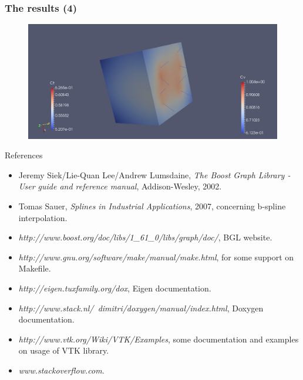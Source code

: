 \documentclass[11pt]{beamer}
\begin{document}
	\begin{frame}
		\frametitle{The results (4)}	
		\begin{figure}[!h]
			\centering
			\includegraphics[width=0.9\linewidth]{ct3}
			\label{fig:ct3}
		\end{figure}
	\end{frame}

	\begin{frame}{References}
		\begin{itemize}
			\item Jeremy Siek/Lie-Quan Lee/Andrew Lumsdaine, \textit{The Boost Graph Library - User guide and reference manual}, Addison-Wesley, 2002.
			\item Tomas Sauer, \textit{Splines in Industrial Applications}, 2007, concerning b-spline interpolation.
			\item \textit{http://www.boost.org/doc/libs/1\_61\_0/libs/graph/doc/}, BGL website.
			\item \textit{http://www.gnu.org/software/make/manual/make.html}, for some support on Makefile.
			\item \textit{http://eigen.tuxfamily.org/dox}, Eigen documentation.
			\item \textit{http://www.stack.nl/~dimitri/doxygen/manual/index.html}, Doxygen documentation.
			\item \textit{http://www.vtk.org/Wiki/VTK/Examples}, some documentation and examples on usage of VTK library.
			\item \textit{www.stackoverflow.com}.
		\end{itemize}
	\end{frame}
\end{document}
